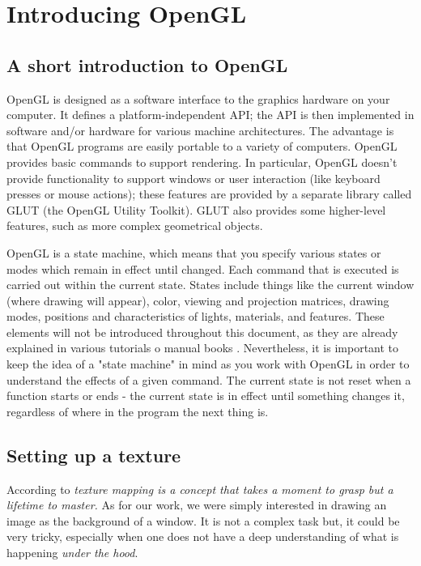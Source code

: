 \section{Introducing OpenGL}
\label{sec:opengl}
\lstset{language=C++}
\subsection{A short introduction to OpenGL}
OpenGL is designed as a software interface to the graphics 
hardware on your computer. It defines a platform-independent API;
the API is then implemented in software and/or hardware for 
various machine architectures. The advantage is that OpenGL 
programs are easily portable to a variety of computers. 
OpenGL provides basic commands to support rendering. 
In particular, OpenGL doesn't provide functionality to support
windows or user interaction (like keyboard presses or mouse 
actions); these features are provided by a separate library called
GLUT (the OpenGL Utility Toolkit). GLUT also provides some 
higher-level features, such as more complex geometrical objects.
%

%
OpenGL is a state machine, which means that you specify various 
states or modes which remain in effect until changed.
Each command that is executed is carried out within the current 
state. States include things like the current window (where
drawing will appear), color, viewing and projection matrices, 
drawing modes, positions and characteristics of lights,
materials, and features. These elements will not be introduced 
throughout this document, as they are already explained in
various tutorials \cite{opengl:brieftutorial} o manual books 
\cite{opengl:redbook}.
%
Nevertheless, it is important to keep the idea of a 
"state machine" in mind as you work with OpenGL in order to 
understand the effects of a given command. The current state 
is not reset when a function starts or ends - the current state
is in effect until something changes it, regardless of where 
in the program the next thing is. 
%
\subsection{Setting up a texture}
According to \cite{opengl:distilled} \textit{texture mapping 
is a concept that takes a moment to grasp but a lifetime 
to master.}
%
As for our work, we were simply interested in drawing an 
image as the background of a window. It is not a complex 
task but, it could be very tricky, especially when one 
does not have a deep understanding of what is happening 
\textit{under the hood}.
%

